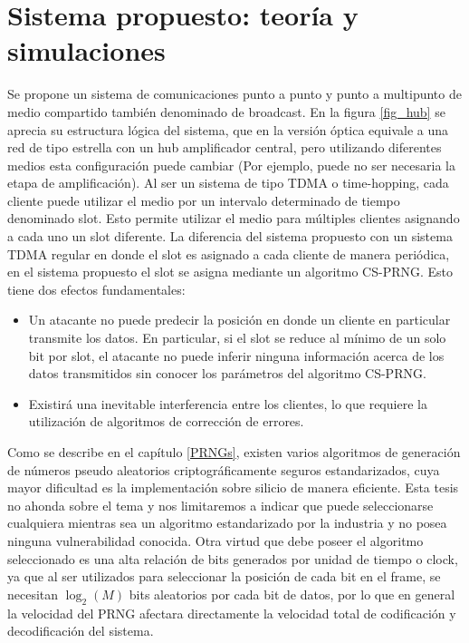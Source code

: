 \chapter{Sistema propuesto: teoría y simulaciones}

Se propone un sistema de comunicaciones punto a punto y punto a multipunto de medio compartido también denominado de broadcast. En la figura \ref{fig_hub} se aprecia su estructura lógica del sistema, que en la versión óptica equivale a una red de tipo estrella con un hub amplificador central, pero utilizando diferentes medios esta configuración puede cambiar (Por ejemplo, puede no ser necesaria la etapa de amplificación).
Al ser un sistema de tipo TDMA o time-hopping, cada cliente puede utilizar el medio por un intervalo determinado de tiempo denominado slot. Esto permite utilizar el medio para múltiples clientes asignando a cada uno un slot diferente. La diferencia del sistema propuesto con un sistema TDMA regular en donde el slot es asignado a cada cliente de manera periódica, en el sistema propuesto el slot se asigna mediante un algoritmo CS-PRNG. Esto tiene dos efectos fundamentales: 

\begin{itemize}
 \item Un atacante no puede predecir la posición en donde un cliente en particular transmite los datos. En particular, si el slot se reduce al mínimo de un solo bit por slot, el atacante no puede inferir ninguna información acerca de los datos transmitidos sin conocer los parámetros del algoritmo CS-PRNG.
 \item Existirá una inevitable interferencia entre los clientes, lo que requiere la utilización de algoritmos de corrección de errores.
\end{itemize}

Como se describe en el capítulo \ref{PRNGs}, existen varios algoritmos de generación de números pseudo aleatorios criptográficamente seguros estandarizados, cuya mayor dificultad es la implementación sobre silicio de manera eficiente. Esta tesis no ahonda sobre el tema y nos limitaremos a indicar que puede seleccionarse cualquiera mientras sea un algoritmo estandarizado por la industria y no posea ninguna vulnerabilidad conocida. Otra virtud que debe poseer el algoritmo seleccionado es una alta relación de bits generados por unidad de tiempo o clock, ya que al ser utilizados para seleccionar la posición de cada bit en el frame, se necesitan $\log_2(M)$ bits aleatorios por cada bit de datos, por lo que en general la velocidad del PRNG afectara directamente la velocidad total de codificación y decodificación del sistema.

